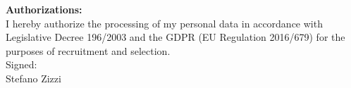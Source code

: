 \noindent\textbf{Authorizations:}\\
{\small
I hereby authorize the processing of my personal data in accordance with Legislative Decree 196/2003 and the GDPR (EU Regulation 2016/679) for the purposes of recruitment and selection.
\\Signed: 
\\Stefano Zizzi}